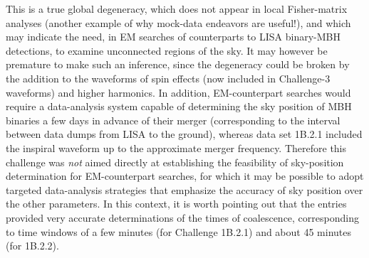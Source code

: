 \documentclass{iopart}
\begin{document}
This is a true global degeneracy, which does not appear in local Fisher-matrix analyses (another example of why mock-data endeavors are useful!), and which may indicate the need, in EM searches of counterparts to LISA binary-MBH detections, to examine unconnected regions of the sky. It may however be premature to make such an inference, since the degeneracy could be broken by the addition to the waveforms of spin effects (now included in Challenge-3 waveforms) and higher harmonics. In addition, EM-counterpart searches would require a data-analysis system capable of determining the sky position of MBH binaries a few days in advance of their merger (corresponding to the interval between data dumps from LISA to the ground), whereas data set 1B.2.1 included the inspiral waveform up to the approximate merger frequency. Therefore this challenge was \emph{not} aimed directly at establishing the feasibility of sky-position determination for EM-counterpart searches, for which it may be possible to adopt targeted data-analysis strategies that emphasize the accuracy of sky position over the other parameters.
In this context, it is worth pointing out that the entries provided very accurate determinations of the times of coalescence, corresponding to time windows of a few minutes (for Challenge 1B.2.1) and about 45 minutes (for 1B.2.2).
\end{document}
